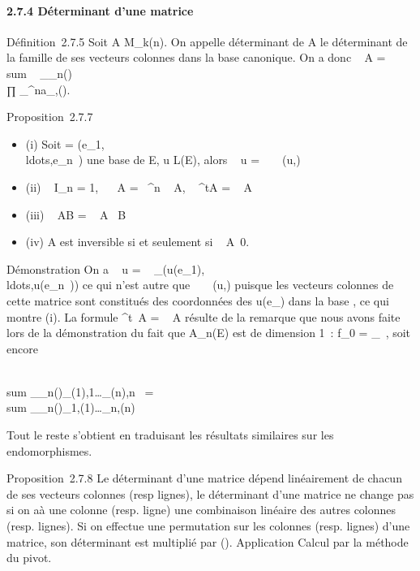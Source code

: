 \documentclass[]{article}
\begin{document}
\paragraph{2.7.4 Déterminant d'une matrice}

Définition~2.7.5 Soit A \in M\_k(n). On appelle déterminant de A
le déterminant de la famille de ses vecteurs colonnes dans la base
canonique. On a donc
~ A
= \\sum ~
\_\sigma\inS\_n\epsilon(\sigma)\\∏
 \_^na\_\jmath,\sigma(\jmath).

Proposition~2.7.7

\begin{itemize}
\itemsep1pt\parskip0pt
\item
  (i) Soit  =
  (e\_1,\\ldots,e\_n~)
  une base de E, u \in L(E), alors
  ~ u
  = ~
  \mathrmMat~ (u,)
\item
  (ii) ~
  I\_n = 1,
  ~ \lambda~A =
  \lambda~^n ~
  A, ~
  ^tA = ~
  A
\item
  (iii) ~ AB
  = ~
  A~ B
\item
  (iv) A est inversible si et seulement si
  ~
  A\neq~0.
\end{itemize}

Démonstration On a
~ u
= ~
\_(u(e\_1),\\ldots,u(e\_n~))
ce qui n'est autre que
~
\mathrmMat~ (u,) puisque
les vecteurs colonnes de cette matrice sont constitués des coordonnées
des u(e\_\jmath) dans la base , ce qui montre (i). La formule
 ^t~A
= ~ A résulte de
la remarque que nous avons faite lors de la démonstration du fait que
A\_n(E) est de dimension 1~: f\_0
=  \_~,
soit encore

\\sum
\_\sigma\inS\_n\epsilon(\sigma)\xi\_\sigma(1),1\ldots\xi\_\sigma(n),n~
= \\sum
\_\sigma\inS\_n\epsilon(\sigma)\xi\_1,\sigma(1)\ldots\xi\_n,\sigma(n)~

Tout le reste s'obtient en traduisant les résultats similaires sur les
endomorphismes.

Proposition~2.7.8 Le déterminant d'une matrice dépend linéairement de
chacun de ses vecteurs colonnes (resp lignes), le déterminant d'une
matrice ne change pas si on a\jmathoute à une colonne (resp. ligne) une
combinaison linéaire des autres colonnes (resp. lignes). Si on effectue
une permutation \sigma sur les colonnes (resp. lignes) d'une matrice, son
déterminant est multiplié par \epsilon(\sigma). Application Calcul par la méthode du
pivot.
\end{document}
